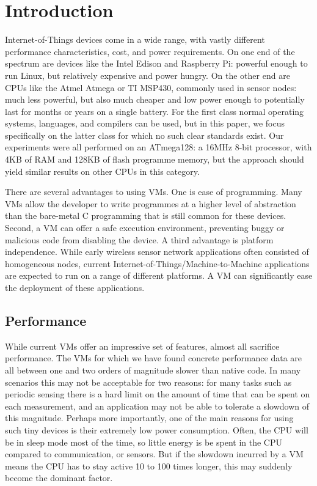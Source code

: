 \chapter{Introduction}
Internet-of-Things devices come in a wide range, with vastly different performance characteristics, cost, and power requirements. On one end of the spectrum are devices like the Intel Edison and Raspberry Pi: powerful enough to run Linux, but relatively expensive and power hungry. On the other end are CPUs like the Atmel Atmega or TI MSP430, commonly used in sensor nodes: much less powerful, but also much cheaper and low power enough to potentially last for months or years on a single battery. For the first class normal operating systems, languages, and compilers can be used, but in this paper, we focus specifically on the latter class for which no such clear standards exist. Our experiments were all performed on an ATmega128: a 16MHz 8-bit processor, with 4KB of RAM and 128KB of flash programme memory, but the approach should yield similar results on other CPUs in this category.

There are several advantages to using VMs. One is ease of programming. Many VMs allow the developer to write programmes at a higher level of abstraction than the bare-metal C programming that is still common for these devices. Second, a VM can offer a safe execution environment, preventing buggy or malicious code from disabling the device. A third advantage is platform independence. While early wireless sensor network applications often consisted of homogeneous nodes, current Internet-of-Things/Machine-to-Machine  applications are expected to run on a range of different platforms. A VM can significantly ease the deployment of these applications.

\section{Performance}
While current VMs offer an impressive set of features, almost all sacrifice performance. The VMs for which we have found concrete performance data are all between one and two orders of magnitude slower than native code. In many scenarios this may not be acceptable for two reasons: for many tasks such as periodic sensing there is a hard limit on the amount of time that can be spent on each measurement, and an application may not be able to tolerate a slowdown of this magnitude. Perhaps more importantly, one of the main reasons for using such tiny devices is their extremely low power consumption. Often, the CPU will be in sleep mode most of the time, so little energy is be spent in the CPU compared to communication, or sensors. But if the slowdown incurred by a VM means the CPU has to stay active 10 to 100 times longer, this may suddenly become the dominant factor.


